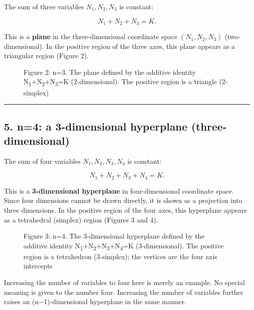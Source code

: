 \documentclass[11pt]{ltjsarticle}
\providecommand{\pandocbounded}[1]{#1}
\begin{document}
The sum of three variables \(N_1, N_2, N_3\) is constant:

\[N_1 + N_2 + N_3 = K .\]

This is a \textbf{plane} in the three-dimensional coordinate space
\((N_1, N_2, N_3)\) (two-dimensional). In the positive region of the
three axes, this plane appears as a triangular region (Figure 2).

\begin{figure}
\centering
\pandocbounded{}
\caption{Figure 2: n=3. The plane defined by the additive identity
N\textsubscript{1}+N\textsubscript{2}+N\textsubscript{3}=K (2-dimensional). The positive region is a triangle
(2-simplex)}
\end{figure}

\begin{center}\rule{0.5\linewidth}{0.5pt}\end{center}

\subsection{5. n=4: a 3-dimensional hyperplane
(three-dimensional)}\label{n4-a-3-dimensional-hyperplane-three-dimensional}

The sum of four variables \(N_1, N_2, N_3, N_4\) is constant:

\[N_1 + N_2 + N_3 + N_4 = K .\]

This is a \textbf{3-dimensional hyperplane} in four-dimensional
coordinate space. Since four dimensions cannot be drawn directly, it is
shown as a projection into three dimensions. In the positive region of
the four axes, this hyperplane appears as a tetrahedral (simplex) region
(Figures 3 and 4).

\begin{figure}
\centering
\pandocbounded{}
\caption{Figure 3: n=4. The 3-dimensional hyperplane defined by the
additive identity N\textsubscript{1}+N\textsubscript{2}+N\textsubscript{3}+N\textsubscript{4}=K (3-dimensional). The positive region is
a tetrahedron (3-simplex); the vertices are the four axis intercepts}
\end{figure}

Increasing the number of variables to four here is merely an example. No
special meaning is given to the number four. Increasing the number of
variables further raises an (n−1)-dimensional hyperplane in the same
manner.
\end{document}
